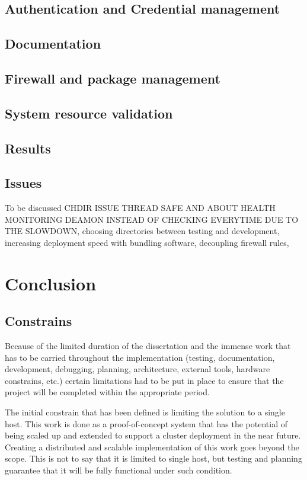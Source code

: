 \documentclass{article}
\begin{document}
\subsection{Authentication and Credential management}

\subsection{Documentation}

\subsection{Firewall and package management}

\subsection{System resource validation}

\subsection{Results}

\subsection{Issues}
{\color{red} 
	To be discussed CHDIR ISSUE THREAD SAFE AND ABOUT HEALTH MONITORING DEAMON INSTEAD OF CHECKING EVERYTIME DUE TO THE SLOWDOWN, choosing directories between testing and development, increasing deployment speed with bundling software, decoupling firewall rules,  
}

\newpage
\section{Conclusion}

\subsection{Constrains}
Because of the limited duration of the dissertation and the immense work that has to be carried throughout the implementation (testing, documentation, development, debugging, planning, architecture, external tools, hardware constrains, etc.) certain limitations had to be put in place to ensure that the project will be completed within the appropriate period.

The initial constrain that has been defined is limiting the solution to a single host. This work is done as a proof-of-concept system that has the potential of being scaled up and extended to support a cluster deployment in the near future.
Creating a distributed and scalable implementation of this work goes beyond the scope. This is not to say that it is limited to single host, but testing and planning guarantee that it will be fully functional under such condition.
\end{document}
